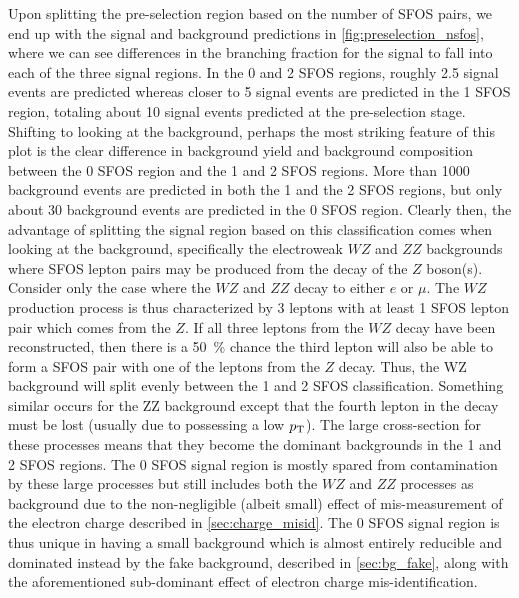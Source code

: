 Upon splitting the pre-selection region based on the number of SFOS
pairs, we end up with the signal and background predictions in
\fig\ref{fig:preselection_nsfos}, where we can see differences
in the branching fraction for the signal to fall into
each of the three signal regions.
In the 0 and 2 SFOS regions, roughly 2.5 signal events are predicted
whereas closer to 5 signal events are predicted in the 1 SFOS region,
totaling about 10 signal events predicted at the pre-selection stage.
Shifting to looking at the background, perhaps the most striking 
feature of this plot is the 
clear difference in background yield and background composition
between the 0 SFOS region and the 1 and 2 SFOS regions.
More than 1000 background events are predicted in both the 1 and
the 2 SFOS regions, but only about 30 background events are
predicted in the 0 SFOS region.
Clearly then, the advantage of splitting the signal region based on this
classification comes when looking at the background, specifically the
electroweak $WZ$ and $ZZ$ backgrounds where SFOS lepton pairs may be
produced from the decay of the $Z$ boson(s). Consider only the case
where the $WZ$ and $ZZ$ decay to either $e$ or $\mu$.  The $WZ$ production
process is thus characterized by 3 leptons with at least 1 SFOS lepton pair
which comes from the $Z$. If all three leptons from the $WZ$ decay have been
reconstructed, then there is a 50~\% chance the third lepton 
will also be able to form a SFOS pair with one of the leptons from the $Z$ decay.
Thus, the WZ background will split evenly between the 1 and 2 SFOS classification.
Something similar occurs for the ZZ background except that the fourth lepton 
in the decay must be lost (usually due to possessing a low $p_{\mathrm{T}}$).
The large cross-section for these processes means that
they become the dominant backgrounds in the 1 and 2 SFOS regions.  
The 0 SFOS signal region is mostly spared from contamination  by 
these large processes but still
includes both the $WZ$ and $ZZ$ processes as background due to the
non-negligible (albeit small) effect of mis-measurement of the electron
charge described in \sec\ref{sec:charge_misid}.  The 0 SFOS signal region
is thus unique in having a small background which is almost entirely
reducible and dominated instead by the fake background,
described in \sec\ref{sec:bg_fake},
along with the aforementioned sub-dominant effect of electron charge 
mis-identification.






